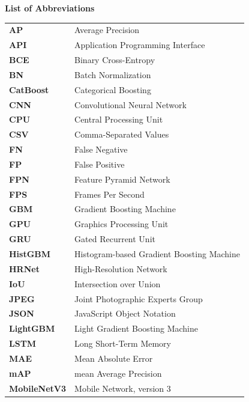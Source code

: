 \thispagestyle{fancy}
\begin{center}
    {\Large \textbf{List of Abbreviations}}
\end{center}
\vspace{0.6cm}

\renewcommand{\arraystretch}{1.25}
\begin{longtable}{@{}p{}p{}@{}}
\textbf{AP}       & Average Precision \\
\textbf{API}      & Application Programming Interface \\
\textbf{BCE}      & Binary Cross-Entropy \\
\textbf{BN}       & Batch Normalization \\
\textbf{CatBoost} & Categorical Boosting \\
\textbf{CNN}      & Convolutional Neural Network \\
\textbf{CPU}      & Central Processing Unit \\
\textbf{CSV}      & Comma-Separated Values \\
\textbf{FN}       & False Negative \\
\textbf{FP}       & False Positive \\
\textbf{FPN}      & Feature Pyramid Network \\
\textbf{FPS}      & Frames Per Second \\
\textbf{GBM}      & Gradient Boosting Machine \\
\textbf{GPU}      & Graphics Processing Unit \\
\textbf{GRU}      & Gated Recurrent Unit \\
\textbf{HistGBM}  & Histogram-based Gradient Boosting Machine \\
\textbf{HRNet}    & High-Resolution Network \\
\textbf{IoU}      & Intersection over Union \\
\textbf{JPEG}     & Joint Photographic Experts Group \\
\textbf{JSON}     & JavaScript Object Notation \\
\textbf{LightGBM} & Light Gradient Boosting Machine \\
\textbf{LSTM}     & Long Short-Term Memory \\
\textbf{MAE}      & Mean Absolute Error \\
\textbf{mAP}      & mean Average Precision \\
\textbf{MobileNetV3} & Mobile Network, version 3 \\

\end{longtable}
